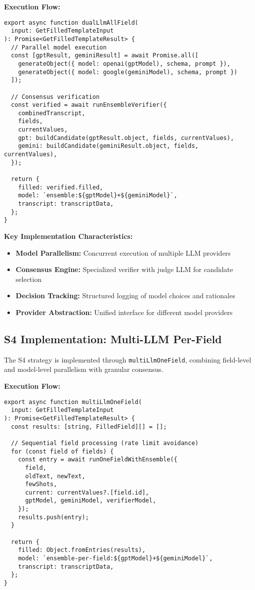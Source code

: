 \textbf{Execution Flow:}
\begin{verbatim}
export async function dualLlmAllField(
  input: GetFilledTemplateInput
): Promise<GetFilledTemplateResult> {
  // Parallel model execution
  const [gptResult, geminiResult] = await Promise.all([
    generateObject({ model: openai(gptModel), schema, prompt }),
    generateObject({ model: google(geminiModel), schema, prompt })
  ]);
  
  // Consensus verification
  const verified = await runEnsembleVerifier({
    combinedTranscript,
    fields,
    currentValues,
    gpt: buildCandidate(gptResult.object, fields, currentValues),
    gemini: buildCandidate(geminiResult.object, fields, currentValues),
  });
  
  return {
    filled: verified.filled,
    model: `ensemble:${gptModel}+${geminiModel}`,
    transcript: transcriptData,
  };
}
\end{verbatim}

\textbf{Key Implementation Characteristics:}
\begin{itemize}
    \item \textbf{Model Parallelism:} Concurrent execution of multiple LLM providers
    \item \textbf{Consensus Engine:} Specialized verifier with judge LLM for candidate selection
    \item \textbf{Decision Tracking:} Structured logging of model choices and rationales
    \item \textbf{Provider Abstraction:} Unified interface for different model providers
\end{itemize}

\subsection{S4 Implementation: Multi-LLM Per-Field}
\label{subsec:impl-s4}

The S4 strategy is implemented through \texttt{multiLlmOneField}, combining field-level and model-level parallelism with granular consensus.

\textbf{Execution Flow:}
\begin{verbatim}
export async function multiLlmOneField(
  input: GetFilledTemplateInput
): Promise<GetFilledTemplateResult> {
  const results: [string, FilledField][] = [];
  
  // Sequential field processing (rate limit avoidance)
  for (const field of fields) {
    const entry = await runOneFieldWithEnsemble({
      field,
      oldText, newText,
      fewShots,
      current: currentValues?.[field.id],
      gptModel, geminiModel, verifierModel,
    });
    results.push(entry);
  }
  
  return {
    filled: Object.fromEntries(results),
    model: `ensemble-per-field:${gptModel}+${geminiModel}`,
    transcript: transcriptData,
  };
}
\end{verbatim}

